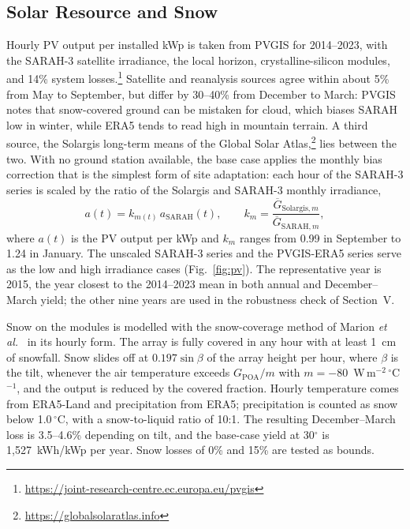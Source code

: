 \subsection{Solar Resource and Snow}
Hourly PV output per installed kWp is taken from PVGIS for 2014--2023, with the SARAH-3 satellite
irradiance, the local horizon, crystalline-silicon modules, and 14\% system losses.\footnote{\url{https://joint-research-centre.ec.europa.eu/pvgis}}
Satellite and reanalysis sources agree within about 5\% from May to September, but differ by 30--40\%
from December to March: PVGIS notes that snow-covered ground can be mistaken for cloud, which biases
SARAH low in winter, while ERA5 tends to read high in mountain terrain.
A third source, the Solargis long-term means of the Global Solar Atlas,\footnote{\url{https://globalsolaratlas.info}} lies between
the two. With no ground station available, the base case applies the monthly bias correction that is
the simplest form of site adaptation: each hour of the SARAH-3 series is scaled by the
ratio of the Solargis and SARAH-3 monthly irradiance,
\begin{equation}
a(t) = k_{m(t)} \, a_{\mathrm{SARAH}}(t), \qquad
k_m = \frac{\overline{G}_{\mathrm{Solargis},m}}{\overline{G}_{\mathrm{SARAH},m}},
\label{eq:scale}
\end{equation}
where $a(t)$ is the PV output per kWp and $k_m$ ranges from 0.99 in September to 1.24 in January. The
unscaled SARAH-3 series and the PVGIS-ERA5 series serve as the low and high irradiance cases
(Fig.~\ref{fig:pv}). The representative year is 2015, the year closest to the 2014--2023 mean in both
annual and December--March yield; the other nine years are used in the robustness
check of Section~V.

Snow on the modules is modelled with the snow-coverage method of Marion \textit{et al.}~\cite{marion2013}
in its hourly form. The array is fully covered in any hour with at least 1~cm of
snowfall. Snow slides off at $0.197\sin\beta$ of the array height per hour, where $\beta$ is the tilt,
whenever the air temperature exceeds $G_{\mathrm{POA}}/m$ with $m=-80$~W\,m$^{-2}$\,$^\circ$C$^{-1}$,
and the output is reduced by the covered fraction. Hourly temperature comes from
ERA5-Land and precipitation from ERA5; precipitation is
counted as snow below 1.0\,$^\circ$C, with a snow-to-liquid ratio of 10:1. The
resulting December--March loss is 3.5--4.6\% depending on tilt, and the base-case yield at 30$^\circ$
is 1,527~kWh/kWp per year. Snow losses of 0\% and 15\% are tested as bounds.


